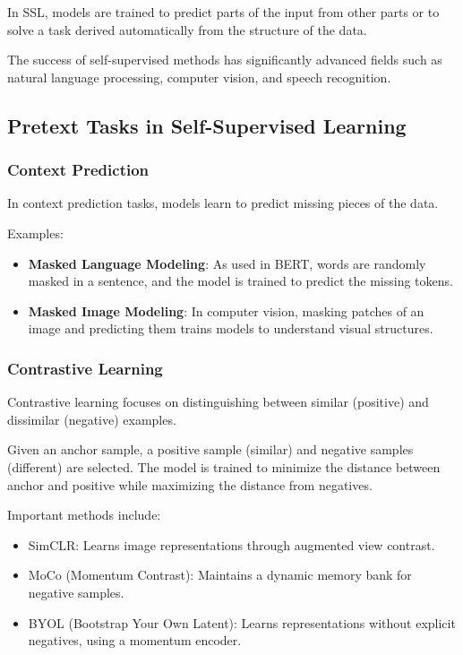 \documentclass[openany]{book}
\begin{document}
In SSL, models are trained to predict parts of the input from other parts or to 
solve a task derived automatically from the structure of the data.

The success of self-supervised methods has significantly advanced fields such as 
natural language processing, computer vision, and speech recognition.

\subsection{Pretext Tasks in Self-Supervised Learning}

\subsubsection{Context Prediction}
In context prediction tasks, models learn to predict missing pieces of the data.

Examples:
\begin{itemize}
    \item \textbf{Masked Language Modeling}: As used in BERT, words are randomly 
    masked in a sentence, and the model is trained to predict the missing 
    tokens.
    \item \textbf{Masked Image Modeling}: In computer vision, masking patches of 
    an image and predicting them trains models to understand visual structures.
\end{itemize}

\subsubsection{Contrastive Learning}
Contrastive learning focuses on distinguishing between similar (positive) and 
dissimilar (negative) examples.

Given an anchor sample, a positive sample (similar) and negative samples 
(different) are selected. The model is trained to minimize the distance between 
anchor and positive while maximizing the distance from negatives.

Important methods include:
\begin{itemize}
    \item SimCLR: Learns image representations through augmented view contrast.
    \item MoCo (Momentum Contrast): Maintains a dynamic memory bank for negative 
    samples.
    \item BYOL (Bootstrap Your Own Latent): Learns representations without 
    explicit negatives, using a momentum encoder.
\end{itemize}
\end{document}
